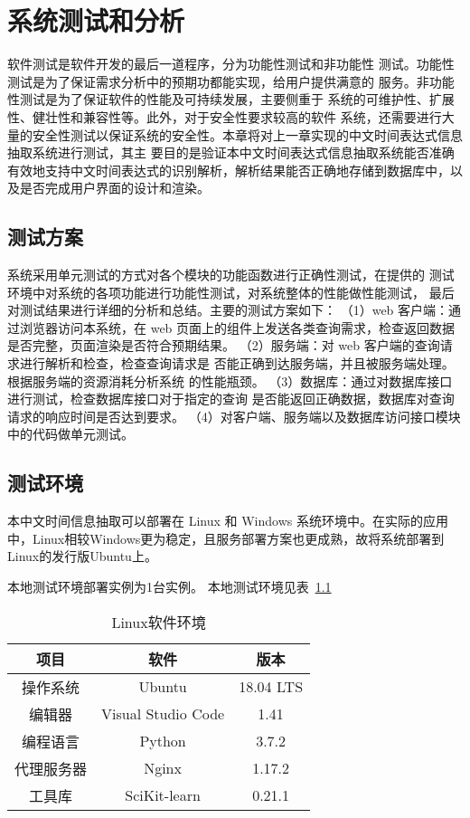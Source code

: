 
\chapter{系统测试和分析}

软件测试是软件开发的最后一道程序，分为功能性测试和非功能性
测试。功能性测试是为了保证需求分析中的预期功都能实现，给用户提供满意的
服务。非功能性测试是为了保证软件的性能及可持续发展，主要侧重于
系统的可维护性、扩展性、健壮性和兼容性等。此外，对于安全性要求较高的软件
系统，还需要进行大量的安全性测试以保证系统的安全性。本章将对上一章实现的中文时间表达式信息抽取系统进行测试，其主
要目的是验证本中文时间表达式信息抽取系统能否准确有效地支持中文时间表达式的识别解析，解析结果能否正确地存储到数据库中，以及是否完成用户界面的设计和渲染。

\section{测试方案}

系统采用单元测试的方式对各个模块的功能函数进行正确性测试，在提供的
测试环境中对系统的各项功能进行功能性测试，对系统整体的性能做性能测试，
最后对测试结果进行详细的分析和总结。主要的测试方案如下：
（1）web 客户端：通过浏览器访问本系统，在 web 页面上的组件上发送各类查询需求，检查返回数据是否完整，页面渲染是否符合预期结果。
（2）服务端：对 web 客户端的查询请求进行解析和检查，检查查询请求是
否能正确到达服务端，并且被服务端处理。根据服务端的资源消耗分析系统
的性能瓶颈。
（3）数据库：通过对数据库接口进行测试，检查数据库接口对于指定的查询
是否能返回正确数据，数据库对查询请求的响应时间是否达到要求。
（4）对客户端、服务端以及数据库访问接口模块中的代码做单元测试。

\section{测试环境}

本中文时间信息抽取可以部署在 Linux 和 Windows 系统环境中。在实际的应用
中，Linux相较Windows更为稳定，且服务部署方案也更成熟，故将系统部署到Linux的发行版Ubuntu上。

本地测试环境部署实例为1台实例。 本地测试环境见表~\ref{tab:local_test}

\begin{table}[h]
    \centering
    \caption{Linux软件环境}
    \begin{tabular}{|*{3}{c|}}
        \hline
        项目       & 软件               & 版本      \\
        \hline
        操作系统   & Ubuntu             & 18.04 LTS \\
        \hline
        编辑器     & Visual Studio Code & 1.41      \\
        编程语言   & Python             & 3.7.2     \\
        \hline
        代理服务器 & Nginx              & 1.17.2    \\
        \hline
        工具库     & SciKit-learn       & 0.21.1    \\
        \hline
    \end{tabular}
    \label{tab:local_test}
\end{table}

